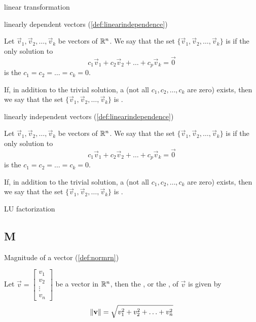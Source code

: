 \documentclass{ximera}
\begin{document}
linear transformation

linearly dependent vectors (\ref{def:linearindependence})
\begin{expandable}
    Let $\vec{v}_1, \vec{v}_2,\ldots ,\vec{v}_k$ be vectors of $\mathbb{R}^n$.  We say that the set $\{\vec{v}_1, \vec{v}_2,\ldots ,\vec{v}_k\}$ is  if the only solution to 
\begin{equation}\label{eq:defLinInd}c_1\vec{v}_1+c_2\vec{v}_2+\ldots +c_p\vec{v}_k=\vec{0}\end{equation}
is the  $c_1=c_2=\ldots =c_k=0$.

If, in addition to the trivial solution, a  (not all $c_1, c_2,\ldots ,c_k$ are zero) exists, then we say that the set $\{\vec{v}_1, \vec{v}_2,\ldots ,\vec{v}_k\}$ is .
\end{expandable}

linearly independent vectors (\ref{def:linearindependence})
\begin{expandable}
    Let $\vec{v}_1, \vec{v}_2,\ldots ,\vec{v}_k$ be vectors of $\mathbb{R}^n$.  We say that the set $\{\vec{v}_1, \vec{v}_2,\ldots ,\vec{v}_k\}$ is  if the only solution to 
\begin{equation}\label{eq:defLinInd}c_1\vec{v}_1+c_2\vec{v}_2+\ldots +c_p\vec{v}_k=\vec{0}\end{equation}
is the  $c_1=c_2=\ldots =c_k=0$.

If, in addition to the trivial solution, a  (not all $c_1, c_2,\ldots ,c_k$ are zero) exists, then we say that the set $\{\vec{v}_1, \vec{v}_2,\ldots ,\vec{v}_k\}$ is .
\end{expandable}

LU factorization

\subsection{M}
Magnitude of a vector (\ref{def:normrn})
\begin{expandable}
Let $\vec{v}=\begin{bmatrix}v_1\\ v_2\\ \vdots \\v_n\end{bmatrix}$ be a vector in $\mathbb{R}^n$, then the , or the , of $\vec{v}$ is given by
$$  \left\lVert\mathbf{v}\right\rVert=\sqrt{v_1^2+v_2^2+\ldots +v_n^2}$$
\end{expandable}
\end{document}
